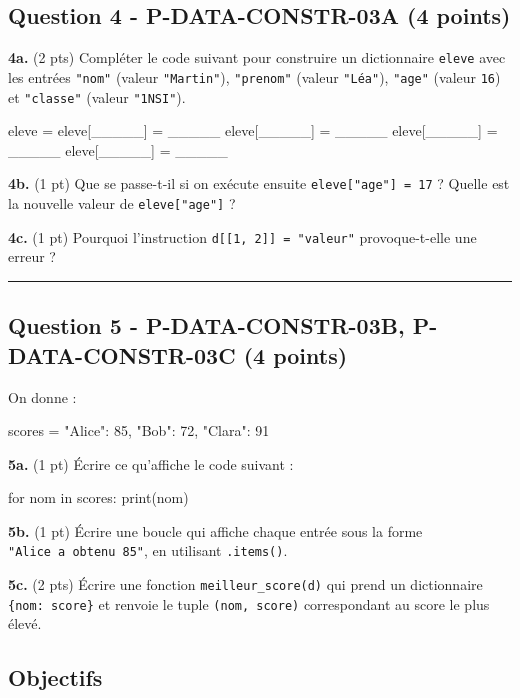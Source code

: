 \subsection{Question 4 - P-DATA-CONSTR-03A (4 points)}

\textbf{4a.} (2 pts) Compléter le code suivant pour construire un
dictionnaire \lstinline|eleve| avec les entrées \lstinline|"nom"| (valeur
\texttt{"Martin"}), \texttt{"prenom"} (valeur \texttt{"Léa"}),
\texttt{"age"} (valeur \texttt{16}) et \texttt{"classe"} (valeur
\texttt{"1NSI"}).

\begin{python}
eleve = {}
eleve[_____] = _____
eleve[_____] = _____
eleve[_____] = _____
eleve[_____] = _____
\end{python}

\textbf{4b.} (1 pt) Que se passe-t-il si on exécute ensuite
\lstinline|eleve["age"] = 17| ? Quelle est la nouvelle valeur de
\lstinline|eleve["age"]| ?

\textbf{4c.} (1 pt) Pourquoi l'instruction
\texttt{d{[}{[}1,\ 2{]}{]}\ =\ "valeur"} provoque-t-elle une erreur ?

\begin{center}\rule{0.5\linewidth}{0.5pt}\end{center}

\subsection{Question 5 - P-DATA-CONSTR-03B, P-DATA-CONSTR-03C (4 points)}

On donne :

\begin{python}
scores = {"Alice": 85, "Bob": 72, "Clara": 91}
\end{python}

\textbf{5a.} (1 pt) Écrire ce qu'affiche le code suivant :

\begin{python}
for nom in scores:
    print(nom)
\end{python}

\textbf{5b.} (1 pt) Écrire une boucle qui affiche chaque entrée sous la
forme \texttt{"Alice\ a\ obtenu\ 85"}, en utilisant \texttt{.items()}.

\textbf{5c.} (2 pts) Écrire une fonction \texttt{meilleur\_score(d)} qui
prend un dictionnaire \texttt{\{nom:\ score\}} et renvoie le tuple
\texttt{(nom,\ score)} correspondant au score le plus élevé.

\subsection{Objectifs}

